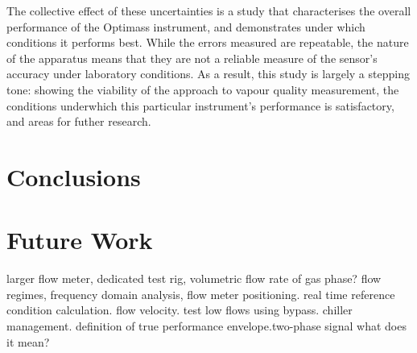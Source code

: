 \documentclass{report}
\begin{document}
The collective effect of these uncertainties is a study that characterises the overall performance of the Optimass instrument, and demonstrates under which conditions it performs best. While the errors measured are repeatable, the nature of the apparatus means that they are not a reliable measure of the sensor's accuracy under laboratory conditions. As a result, this study is largely a stepping tone: showing the viability of the approach to vapour quality measurement, the conditions underwhich this particular instrument's performance is satisfactory, and areas for futher research.
\chapter{Conclusions}
\chapter{Future Work}
\label{further research}
larger flow meter, dedicated test rig, volumetric flow rate of gas phase? flow regimes, frequency domain analysis, flow meter positioning. real time reference condition calculation. flow velocity. test low flows using bypass. chiller management. definition of true performance envelope.two-phase signal what does it mean?

\end{document}
